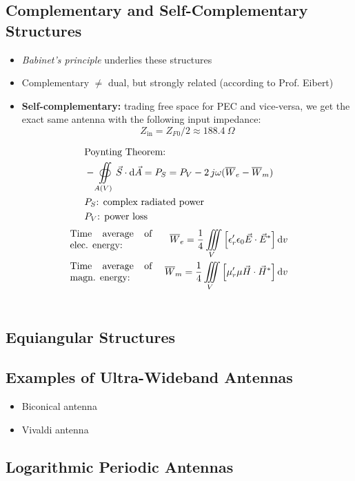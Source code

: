 \subsection{Complementary and Self-Complementary Structures}
\begin{itemize}
    \itemsep0pt
    \item \textit{Babinet's principle} underlies these structures
    \item Complementary $\neq$ dual, but strongly related (according to Prof. Eibert)
    \item \textbf{Self-complementary:} trading free space for PEC and vice-versa, we get the exact same antenna with the following input impedance:
        \begin{equation*}
            Z_{\mathrm{in}} = Z_{F0}/2 \approx \SI{188.4}{\Omega}
        \end{equation*}
\end{itemize}
\begin{align*}
    &\parbox{3cm}{Poynting Theorem: }\\
    &-\oiint\limits_{A(V)}\vec{S}\cdot\mathrm{d}\vec{A} = P_S = P_V - 2\,j\omega(\overline{W}_e - \overline{W}_m)\\
    &P_S\text{: complex radiated power}\\
    &P_V\text{: power loss}\\
\end{align*}
\begin{align*}
    &\parbox{3cm}{Time average of elec. energy: }\
    &\overline{W}_e = \dfrac{1}{4} \iiint\limits_V \left[\epsilon^\prime_r \epsilon_0 \vec{E}\cdot\vec{E}^*\right]\mathrm{d}v\\
    &\parbox{3cm}{Time average of magn. energy: }\
    &\overline{W}_m = \dfrac{1}{4} \iiint\limits_V \left[\mu^\prime_r \mu \vec{H}\cdot\vec{H}^*\right]\mathrm{d}v\\\\
\end{align*}

\subsection{Equiangular Structures}
\subsection{Examples of Ultra-Wideband Antennas}
\begin{itemize}
    \itemsep0pt
    \item Biconical antenna
    \item Vivaldi antenna
\end{itemize}

\subsection{Logarithmic Periodic Antennas}
